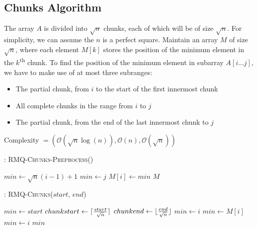 \documentclass{article}
\begin{document}
\subsection{Chunks Algorithm}
The array $A$ is divided into $\sqrt n$ chunks, each of which will be of size $\sqrt n$. For simplicity, we can assume the $n$ is a perfect square. Maintain an array $M$ of size $\sqrt n$, where each element $M[k]$ stores the position of the minimum element in the $k$\textsuperscript{th} chunk. To find the position of the minimum element in subarray $A[i \ldots j]$, we have to make use of at most three subranges:
\begin{itemize}
\item The partial chunk, from $i$ to the start of the first innermost chunk
\item All complete chunks in the range from $i$ to $j$
\item The partial chunk, from the end of the last innermost chunk to $j$
\end{itemize}

Complexity $= (\mathcal{O}(\sqrt n \log(n)), \mathcal{O}(n), \mathcal{O}(\sqrt n))$

\begin{algorithm}
\begin{algorithmic}[1]
\caption{: \textsc{RMQ-Chunks-Preprocess}()}
\medskip
{}
	\STATE $min \gets \sqrt n (i-1) + 1$
			\STATE $min \gets j$
		\ENDIF
	\ENDFOR
	\medskip
	\STATE $M[i] \gets min$
\ENDFOR
\medskip
\RETURN $M$
\medskip
\end{algorithmic}
\end{algorithm}

\begin{algorithm}
\begin{algorithmic}[1]
\caption{: \textsc{RMQ-Chunks}($start$, $end$)}
\medskip
\STATE $min \gets start$
\STATE $chunkstart \gets \lceil {start \over \sqrt n} \rceil$
\STATE $chunkend \gets \lfloor {end \over \sqrt n} \rfloor$
\medskip
{}
		\STATE $min \gets i$
	\ENDIF
\ENDFOR
{}
		\STATE $min \gets M[i]$
	\ENDIF
\ENDFOR
{}
		\STATE $min \gets i$
	\ENDIF
\ENDFOR
\medskip
\RETURN $min$
\medskip
\end{algorithmic}
\end{algorithm}
\end{document}
